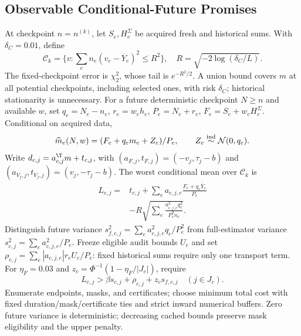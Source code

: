 \subsection{Observable Conditional-Future Promises}
\label{app:v37-online}
At checkpoint $n=n^{(k)}$, let $S_e,H_e^\Sigma$ be acquired fresh and historical sums. With $\delta_C=0.01$, define
$$\mathcal C_k=\{v:\sum_en_e(v_e-\overline Y_e)^2\leq R^2\},\quad
R=\sqrt{-2\log(\delta_C/L)}.$$
The fixed-checkpoint error is $\chi_2^2$, whose tail is $e^{-R^2/2}$. A union bound covers $m$ at all potential checkpoints, including selected ones, with risk $\delta_C$; historical stationarity is unnecessary.
For a future deterministic checkpoint $N\geq n$ and available $w$, set $q_e=N_e-n_e$, $r_e=w_eh_e$, $P_e=N_e+r_e$, $F_e=S_e+w_eH_e^\Sigma$. Conditional on acquired data,
$$\widehat m_e(N,w)=(F_e+q_em_e+Z_e)/P_e,\qquad Z_e\overset{\rm ind}{\sim}\mathcal N(0,q_e).$$
Write $d_{c,j}=a_{c,j}^\T m+t_{c,j}$, with $(a_{F,j},t_{F,j})=(-v_j,\tau_j-b)$ and $(a_{V_j,j},t_{V_j,j})=(v_j,-\tau_j-b)$. The worst conditional mean over $\mathcal C_k$ is
\begin{align}
L_{c,j}={}&t_{c,j}+\sum_ea_{c,j,e}\frac{F_e+q_e\overline Y_e}{P_e}
\nonumber\\
&-R\sqrt{\sum_e\frac{a_{c,j,e}^2q_e^2}{P_e^2n_e}}.
\label{eq:v37-conditional-margin}
\end{align}
Distinguish future variance $s_{f,c,j}^2=\sum_ea_{c,j,e}^2q_e/P_e^2$ from full-estimator variance $s_{c,j}^2=\sum_ea_{c,j,e}^2/P_e$. Freeze eligible audit bounds $U_e$ and set $\rho_{c,j}=\sum_e|a_{c,j,e}|r_eU_e/P_e$: fixed historical sums require only one transport term. For $\eta_F=0.03$ and $z_c=\Phi^{-1}(1-\eta_F/|J_c|)$, require
\begin{equation}
L_{c,j}>\beta s_{c,j}+\rho_{c,j}+z_cs_{f,c,j}
\quad(j\in J_c).
\label{eq:v37-promise-condition}
\end{equation}
Enumerate endpoints, masks, and certificates; choose minimum total cost with fixed duration/mask/certificate ties and strict inward numerical buffers. Zero future variance is deterministic; decreasing cached bounds preserve mask eligibility and the upper penalty.

